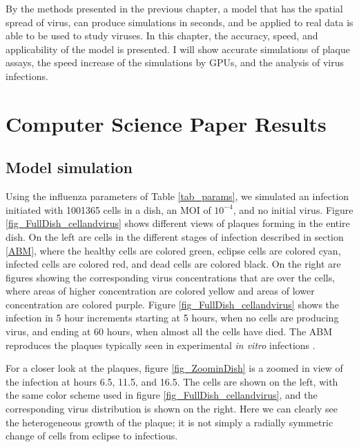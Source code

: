 By the methods presented in the previous chapter, a model that has the spatial spread of virus, can produce simulations in seconds, and be applied to real data is able to be used to study viruses. In this chapter, the accuracy, speed, and applicability of the model is presented. I will show accurate simulations of plaque assays, the speed increase of the simulations by GPUs, and the analysis of virus infections.

\section{Computer Science Paper Results}
\subsection{Model simulation}

Using the influenza parameters of Table \ref{tab_params}, we simulated an infection initiated with 1001365 cells in a dish, an MOI of $10^{-4}$, and no initial virus. Figure \ref{fig_FullDish_cellandvirus} shows different views of plaques forming in the entire dish. On the left are cells in the different stages of infection described in section \ref{ABM}, where the healthy cells are colored green, eclipse cells are colored cyan, infected cells are colored red, and dead cells are colored black. On the right are figures showing the corresponding virus concentrations that are over the cells, where areas of higher concentration are colored yellow and areas of lower concentration are colored purple. Figure \ref{fig_FullDish_cellandvirus} shows the infection in 5 hour increments starting at 5 hours, when no cells are producing virus, and ending at 60 hours, when almost all the cells have died. The ABM reproduces the plaques typically seen in experimental \emph{in vitro} infections \cite{holder11H274Y}. 

For a closer look at the plaques, figure \ref{fig_ZoominDish} is a zoomed in view of the infection at hours 6.5, 11.5, and 16.5. The cells are shown on the left, with the same color scheme used in figure \ref{fig_FullDish_cellandvirus}, and the corresponding virus distribution is shown on the right. Here we can clearly see the heterogeneous growth of the plaque; it is not simply a radially symmetric change of cells from eclipse to infectious. 


